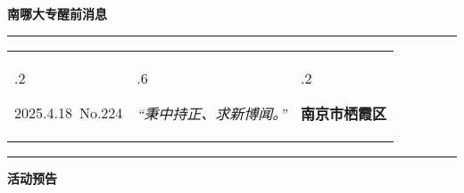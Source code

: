 \documentclass[letterpaper, 12pt]{article}
\begin{document}
\begin{center}
    \Huge\textbf{南哪大专醒前消息}
\end{center}
\vspace{4mm}
\hrule
\renewcommand\tabularxcolumn[1]{m{#1}}
\begin{tabularx}{\textwidth}{>{\hsize.2\hsize}X>{\hsize.6\hsize}X>{\hsize.2\hsize}X}
    \begin{flushleft}
        2025.4.18\, No.224
    \end{flushleft}
    &
    \begin{center}
        \textit{“秉中持正、求新博闻。”}
    \end{center}
    &
    \begin{flushright}
        \textbf{南京市栖霞区}
    \end{flushright}
\end{tabularx}
\vspace{-3.5mm}
\hrule
\vspace{4mm}
\centerline{\huge\textbf{活动预告}}
\end{document}
